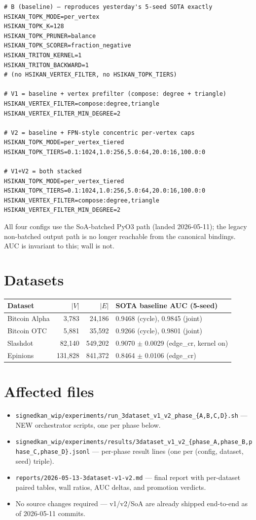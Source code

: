 \documentclass[11pt,a4paper]{article}
\begin{document}
\begin{lstlisting}
# B (baseline) — reproduces yesterday's 5-seed SOTA exactly
HSIKAN_TOPK_MODE=per_vertex
HSIKAN_TOPK_K=128
HSIKAN_TOPK_PRUNER=balance
HSIKAN_TOPK_SCORER=fraction_negative
HSIKAN_TRITON_KERNEL=1
HSIKAN_TRITON_BACKWARD=1
# (no HSIKAN_VERTEX_FILTER, no HSIKAN_TOPK_TIERS)

# V1 = baseline + vertex prefilter (compose: degree + triangle)
HSIKAN_VERTEX_FILTER=compose:degree,triangle
HSIKAN_VERTEX_FILTER_MIN_DEGREE=2

# V2 = baseline + FPN-style concentric per-vertex caps
HSIKAN_TOPK_MODE=per_vertex_tiered
HSIKAN_TOPK_TIERS=0.1:1024,1.0:256,5.0:64,20.0:16,100.0:0

# V1+V2 = both stacked
HSIKAN_TOPK_MODE=per_vertex_tiered
HSIKAN_TOPK_TIERS=0.1:1024,1.0:256,5.0:64,20.0:16,100.0:0
HSIKAN_VERTEX_FILTER=compose:degree,triangle
HSIKAN_VERTEX_FILTER_MIN_DEGREE=2
\end{lstlisting}

All four configs use the SoA-batched PyO3 path (landed 2026-05-11);
the legacy non-batched output path is no longer reachable from the
canonical bindings.  AUC is invariant to this; wall is not.

\section{Datasets}

\begin{tabular}{lrrl}
\toprule
Dataset & $|V|$ & $|E|$ & SOTA baseline AUC (5-seed) \\
\midrule
Bitcoin Alpha & 3{,}783 & 24{,}186 & 0.9468 (cycle), 0.9845 (joint) \\
Bitcoin OTC   & 5{,}881 & 35{,}592 & 0.9266 (cycle), 0.9801 (joint) \\
Slashdot      & 82{,}140 & 549{,}202 & 0.9070 $\pm$ 0.0029 (edge\_cr, kernel on) \\
Epinions      & 131{,}828 & 841{,}372 & 0.8464 $\pm$ 0.0106 (edge\_cr) \\
\bottomrule
\end{tabular}

\section{Affected files}
\begin{itemize}
\item \texttt{signedkan\_wip/experiments/run\_3dataset\_v1\_v2\_phase\_\{A,B,C,D\}.sh}
  --- NEW orchestrator scripts, one per phase below.
\item \texttt{signedkan\_wip/experiments/results/3dataset\_v1\_v2\_\{phase\_A,phase\_B,phase\_C,phase\_D\}.jsonl}
  --- per-phase result lines (one per (config, dataset, seed) triple).
\item \texttt{reports/2026-05-13-3dataset-v1-v2.md} --- final report
  with per-dataset paired tables, wall ratios, AUC deltas, and
  promotion verdicts.
\item No source changes required --- v1/v2/SoA are already shipped
  end-to-end as of 2026-05-11 commits.
\end{itemize}
\end{document}
